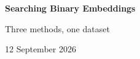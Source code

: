 \documentclass[10pt,a4paper]{article}
\begin{document}
{\Large\bfseries\color{Ink} Searching Binary Embeddings}\par
{\large Three methods, one dataset}\par
{\small 12 September 2026}\par





\end{document}
